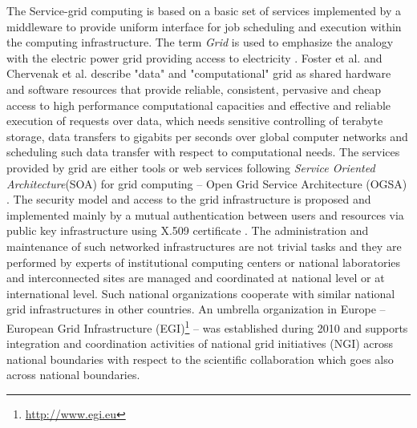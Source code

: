 The Service-grid computing is based on a basic set of services implemented by a middleware to provide uniform interface for job scheduling and execution within the computing infrastructure. The term \emph{Grid} is used to emphasize the analogy with the electric power grid providing access to electricity \cite{foster2004}. Foster et al.\cite{foster2001,foster2004} and Chervenak et al. \cite{Chervenak2000} describe "data" and "computational" grid as shared hardware and software resources that provide reliable, consistent, pervasive and cheap access to high performance computational capacities and  effective and reliable execution of requests over data, which needs sensitive controlling of terabyte storage, data transfers to gigabits per seconds over global computer networks and scheduling such data transfer with respect to computational needs. The services provided by grid are either tools or web services following  \emph{Service Oriented Architecture}(SOA) for grid computing -- Open Grid Service Architecture (OGSA) \cite{Foster2003}. The security model and access to the grid infrastructure is proposed and implemented mainly by a mutual authentication between users and resources via public key infrastructure using X.509 certificate \cite{Foster1998}.
The administration and maintenance of such networked infrastructures are not trivial tasks and they are performed by experts of institutional computing centers or national laboratories and interconnected sites are managed and coordinated at national level or at international level. Such national organizations cooperate with similar national grid infrastructures in other countries. An umbrella organization in Europe --European Grid Infrastructure (EGI)\footnote{\url{http://www.egi.eu}} -- was established during 2010 and supports integration and coordination activities of national grid initiatives (NGI) across national boundaries with respect to the scientific collaboration which goes also across national boundaries. 

